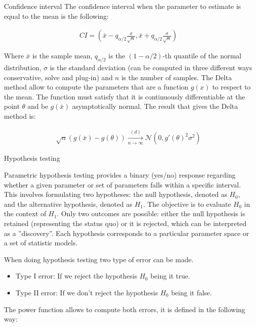 \documentclass{beamer}
\begin{document}
\begin{frame}
\begin{columns}
\begin{column}{0.3\textwidth}
\begin{block}{Confidence interval}
The confidence interval when the parameter to estimate is equal to the mean is the following:

\begin{align*}
    CI = \left( \bar{x} - q_{\alpha/2} \frac{\sigma}{\sqrt{n}}, \bar{x} + q_{\alpha/2} \frac{\sigma}{\sqrt{n}} \right)
\end{align*}

Where $\bar{x}$ is the sample mean, $q_{\alpha/2}$ is the $(1 - \alpha/2)$-th quantile of the normal distribution, $\sigma$ is the standard deviation (can be computed in three different ways conservative, solve and plug-in) and $n$ is the number of samples. The Delta method allow to compute the parameters that are a function $g(x)$ to respect to the mean. The function must satisfy that it is continuously differentiable at the point $\theta$ and be $g(\bar{x})$ asymptotically normal. The result that gives the Delta method is:

\begin{align*}
    \sqrt{n}(g(\bar{x}) - g(\theta)) \xrightarrow[n \to \infty]{(d)} \mathcal{N}(0, g'(\theta)^2 \sigma^2)
\end{align*}
   
\end{block}

\begin{block}{Hypothesis testing}

Parametric hypothesis testing provides a binary (yes/no) response regarding whether a given parameter or set of parameters falls within a specific interval. This involves formulating two hypotheses: the null hypothesis, denoted as $H_0$, and the alternative hypothesis, denoted as $H_1$. The objective is to evaluate $H_0$ in the context of $H_1$. Only two outcomes are possible: either the null hypothesis is retained (representing the status quo) or it is rejected, which can be interpreted as a ''discovery''. Each hypothesis corresponds to a particular parameter space or a set of statistic models.

When doing hypothesis testing two type of error can be made.

\begin{itemize}
    \item Type I error: If we reject the hypothesis $H_0$ being it true.
    \item Type II error: If we don't reject the hypothesis $H_0$ being it false.
\end{itemize}

The power function allows to compute both errors, it is defined in the following way:


\end{block}
\end{column}
\end{columns}
\end{frame}
\end{document}

